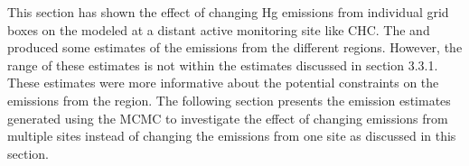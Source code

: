         




\begin{flushleft}
     This section has shown the effect of changing Hg emissions from individual grid boxes on the modeled \hgc at a distant active monitoring site like CHC. The \iq and \nft produced some estimates of the \hg emissions from the different regions. However, the range of these estimates is not within the estimates discussed in  section 3.3.1. These estimates were more informative about the potential constraints on the emissions from the region. The following section presents the emission estimates generated using the MCMC to investigate the effect of changing emissions from multiple sites instead of changing the emissions from one site as discussed in this section.  
     

   
 
\end{flushleft}

